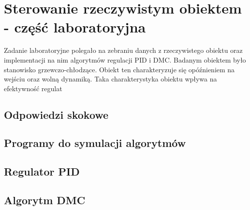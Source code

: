 \chapter{Sterowanie rzeczywistym obiektem - część laboratoryjna}
Zadanie laboratoryjne polegało na zebraniu danych z rzeczywistego obiektu oraz implementacji na nim algorytmów regulacji PID i DMC. Badanym obiektem było stanowisko grzewczo-chłodzące. Obiekt ten charakteryzuje się opóźnieniem na wejściu oraz wolną dynamiką. Taka charakterystyka obiektu wpływa na efektywność regulat 
\section{Odpowiedzi skokowe}

\section{Programy do symulacji algorytmów}

\section{Regulator PID}

\section{Algorytm DMC}